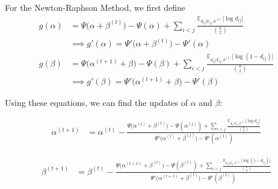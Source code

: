 \documentclass{article}
\begin{document}
For the Newton-Raphson Method, we first define 
\begin{align*}
g(\alpha) &= \Psi \big(\alpha + \beta^{(t)} \big) - \Psi(\alpha) + \sum_{i < j}\frac{ \mathbb{E}_{d_{ij} | Y_{ij}, \theta^{(t)}} \big[\log d_{ij}\big] }{{n \choose 2}} \\
&\implies g'(\alpha) = \Psi' \big(\alpha + \beta^{(t)} \big) - \Psi'(\alpha) \\
g(\beta) &= \Psi \big(\alpha^{(t+1)} + \beta \big) - \Psi(\beta) + \sum_{i < j}\frac{ \mathbb{E}_{d_{ij} | Y_{ij}, \theta^{(t)}} \big[\log (1- d_{ij})\big] }{{n \choose 2}} \\
&\implies g'(\beta) = \Psi' \big(\alpha^{(t+1)}  + \beta\big) - \Psi'(\beta)
\end{align*}

Using these equations, we can find the updates of $\alpha$ and $\beta$:

\begin{align*}
\alpha^{(t+1)} &= \alpha^{(t)} - \frac{\Psi\big(\alpha^{(t)} + \beta^{(t)}\big) - \Psi(\alpha^{(t)}) + \sum_{i < j}\frac{ \mathbb{E}_{d_{ij} | Y_{ij}, \theta^{(t)}} \big[\log d_{ij}\big] }{{n \choose 2}}}{\Psi'\big(\alpha^{(t)} + \beta^{(t)}\big) - \Psi'(\alpha^{(t)})} \tag{$\alpha$}
\end{align*}

\begin{align*}
\beta^{(t+1)} &= \beta^{(t)} - \frac{\Psi\big(\alpha^{(t+1)} + \beta^{(t)}\big) - \Psi(\beta^{(t)}) + \sum_{i < j}\frac{ \mathbb{E}_{d_{ij} | Y_{ij}, \theta^{(t)}} \big[\log (1- d_{ij})\big] }{{n \choose 2}}}{\Psi'\big(\alpha^{(t+1)} + \beta^{(t)}\big) - \Psi'(\beta^{(t)})} \tag{$\beta$}
\end{align*}

\end{document}
